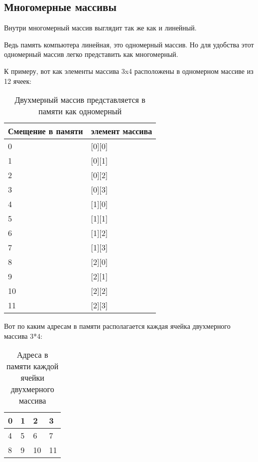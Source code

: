 \subsection{Многомерные массивы}

Внутри многомерный массив выглядит так же как и линейный.

Ведь память компьютера линейная, это одномерный массив.
Но для удобства этот одномерный массив легко представить как многомерный.

К примеру, вот как элементы массива 3x4 расположены в одномерном массиве из 12 ячеек:

\begin{table}[H]
\centering
\begin{tabular}{ | l | l | }
\hline
Смещение в памяти & элемент массива \\
\hline
0 & [0][0] \\
\hline
1 & [0][1] \\
\hline
2 & [0][2] \\
\hline
3 & [0][3] \\
\hline
4 & [1][0] \\
\hline
5 & [1][1] \\
\hline
6 & [1][2] \\
\hline
7 & [1][3] \\
\hline
8 & [2][0] \\
\hline
9 & [2][1] \\
\hline
10 & [2][2] \\
\hline
11 & [2][3] \\
\hline
\end{tabular}
\caption{Двухмерный массив представляется в памяти как одномерный}
\end{table}

Вот по каким адресам в памяти располагается каждая ячейка двухмерного массива 3*4:

\begin{table}[H]
\centering
\begin{tabular}{ | l | l | l | l | }
\hline                        
0 & 1 & 2 & 3 \\
\hline  
4 & 5 & 6 & 7 \\
\hline  
8 & 9 & 10 & 11 \\
\hline  
\end{tabular}
\caption{Адреса в памяти каждой ячейки двухмерного массива}
\end{table}

